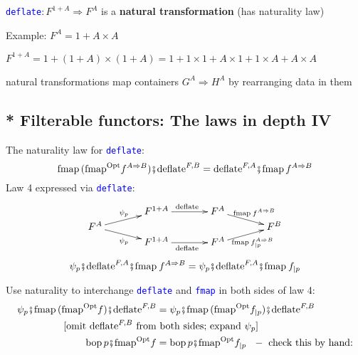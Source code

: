 \texttt{\textcolor{blue}{\footnotesize{}deflate}}{\footnotesize{}$:F^{1+A}\Rightarrow F^{A}$}
 is a \textbf{natural transformation} (has naturality law)

Example:{\footnotesize{} $F^{A}=1+A\times A$}{\footnotesize\par}

{\footnotesize{}$F^{1+A}=1+(1+A)\times(1+A)=1+1\times1+A\times1+1\times A+A\times A$}{\footnotesize\par}

{\footnotesize{}natural transformations map containers $G^{A}\Rightarrow H^{A}$
by rearranging data in them}{\footnotesize\par}


\subsection{{*} Filterable functors: The laws in depth IV}

The naturality law for \texttt{\textcolor{blue}{\footnotesize{}deflate}}:{\footnotesize{}
\[
\text{fmap}\,(\text{fmap}^{\text{Opt}}f^{A\Rightarrow B})\bef\text{deflate}^{F,B}=\text{deflate}^{F,A}\bef\text{fmap}\,f^{A\Rightarrow B}
\]
}Law 4 expressed via \texttt{\textcolor{blue}{\footnotesize{}deflate}}:{\footnotesize{}
\[
\xymatrix{\xyScaleY{0.1pc}\xyScaleX{3pc} & F^{1+A}\ar[r]\sp(0.5){\text{deflate}} & F^{A}\ar[rd]\sp(0.5){\text{ fmap}\:f^{A\Rightarrow B}}\\
F^{A}\ar[ru]\sp(0.5){\psi_{p}}\ar[rd]\sb(0.5){\psi_{p}} &  &  & F^{B}\\
 & F^{1+A}\ar[r]\sb(0.5){\text{deflate}} & F^{A}\ar[ru]\sb(0.5){\text{fmap}\:f_{|p}^{A\Rightarrow B}}
}
\]
\[
\psi_{p}\bef\text{deflate}^{F,A}\bef\text{fmap}\:f^{A\Rightarrow B}=\psi_{p}\bef\text{deflate}^{F,A}\bef\text{fmap}\:f_{|p}
\]
}{\footnotesize\par}

Use naturality to interchange \texttt{\textcolor{blue}{\footnotesize{}deflate}}
and \texttt{\textcolor{blue}{\footnotesize{}fmap}} in both sides of
law 4:{\footnotesize{}
\begin{align*}
\psi_{p}\bef\text{fmap}\,(\text{fmap}^{\text{Opt}}f)\bef\text{deflate}^{F,B} & =\psi_{p}\bef\text{fmap}\,(\text{fmap}^{\text{Opt}}f_{|p})\bef\text{deflate}^{F,B}\\
\text{[omit }\text{deflate}^{F,B}\text{ from} & \ \text{both sides; expand }\psi_{p}\text{]}\\
\text{bop}\,p\bef\text{fmap}^{\text{Opt}}f & =\text{bop}\,p\bef\text{fmap}^{\text{Opt}}f_{|p}\ \ -\text{ check this by hand:}
\end{align*}
}{\footnotesize\par}

